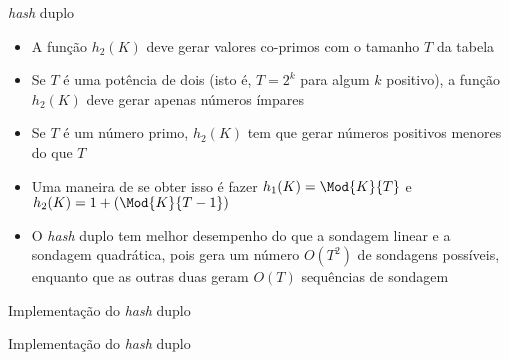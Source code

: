 \begin{frame}[fragile]{\textit{hash} duplo}

    \begin{itemize}
        \item A função $h_2(K)$ deve gerar valores co-primos com o tamanho $T$ da tabela

        \item Se $T$ é uma potência de dois (isto é, $T = 2^k$ para algum $k$ positivo), a
            função $h_2(K)$ deve gerar apenas números ímpares

        \item Se $T$ é um número primo, $h_2(K)$ tem que gerar números positivos menores do que
            $T$

        \item Uma maneira de se obter isso é fazer $h_1(K) = \Mod{K}{T}$ e $h_2(K) = 1 + (\Mod{K}{T - 1})$

        \item O \textit{hash} duplo tem melhor desempenho do que a sondagem linear e a sondagem
            quadrática, pois gera um número $O(T^2)$ de sondagens possíveis, enquanto que
            as outras duas geram $O(T)$ sequências de sondagem
        
    \end{itemize}

\end{frame}



\begin{frame}[fragile]{Implementação do \textit{hash} duplo}
\end{frame}

\begin{frame}[fragile]{Implementação do \textit{hash} duplo}
\end{frame}
